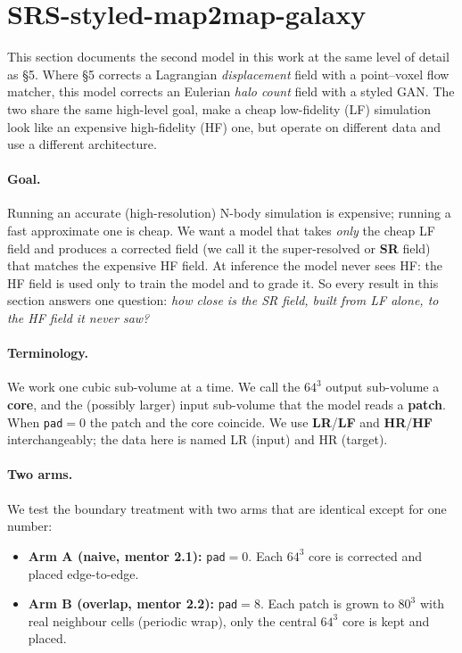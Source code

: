 
\section{SRS-styled-map2map-galaxy}
\label{sec:srs}

This section documents the second model in this work at the same level of
detail as \S5. Where \S5 corrects a Lagrangian \emph{displacement} field with a
point--voxel flow matcher, this model corrects an Eulerian \emph{halo count}
field with a styled GAN. The two share the same high-level goal, make a cheap
low-fidelity (LF) simulation look like an expensive high-fidelity (HF) one, 
but operate on different data and use a different architecture.

\paragraph{Goal.} Running an accurate (high-resolution) N-body simulation is
expensive; running a fast approximate one is cheap. We want a model that takes
\emph{only} the cheap LF field and produces a corrected field (we call it the
super-resolved or \textbf{SR} field) that matches the expensive HF field. At
inference the model never sees HF: the HF field is used only to train the model
and to grade it. So every result in this section answers one question: \emph{how
close is the SR field, built from LF alone, to the HF field it never saw?}

\paragraph{Terminology.} We work one cubic sub-volume at a time. We call the
$64^3$ output sub-volume a \textbf{core}, and the (possibly larger) input
sub-volume that the model reads a \textbf{patch}. When \texttt{pad}${=}0$ the
patch and the core coincide. We use \textbf{LR}/\textbf{LF} and
\textbf{HR}/\textbf{HF} interchangeably; the data here is named LR (input) and
HR (target).

\paragraph{Two arms.} We test the boundary treatment with two arms that are
identical except for one number:
\begin{itemize}
  \item \textbf{Arm A (naive, mentor 2.1):} \texttt{pad}${=}0$. Each $64^3$ core
  is corrected and placed edge-to-edge.
  \item \textbf{Arm B (overlap, mentor 2.2):} \texttt{pad}${=}8$. Each patch is
  grown to $80^3$ with real neighbour cells (periodic wrap), only the central
  $64^3$ core is kept and placed.
\end{itemize}

